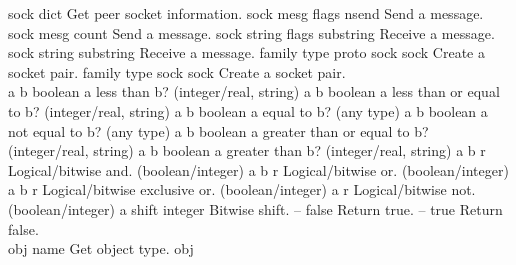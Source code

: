 \begin{longtable}{}
\hline
\optableent
	{sock}
	{{\bf {}}}
	{dict}
	{Get peer socket information.}
\hline
\optableent
	{sock mesg flags}
	{{\bf {}}}
	{nsend}
	{Send a message.}
\optableent
	{sock mesg}
	{{\bf {}}}
	{count}
	{Send a message.}
\hline
\optableent
	{sock string flags}
	{{\bf {}}}
	{substring}
	{Receive a message.}
\optableent
	{sock string}
	{{\bf {}}}
	{substring}
	{Receive a message.}
\hline
\optableent
	{family type proto}
	{{\bf {}}}
	{sock sock}
	{Create a socket pair.}
\optableent
	{family type}
	{{\bf {}}}
	{sock sock}
	{Create a socket pair.}
\hline \hline
{} \\
\hline \hline
\optableent
	{a b}
	{{\bf {}}}
	{boolean}
	{a less than b? (integer/real, string)}
\hline
\optableent
	{a b}
	{{\bf {}}}
	{boolean}
	{a less than or equal to b? (integer/real, string)}
\hline
\optableent
	{a b}
	{{\bf {}}}
	{boolean}
	{a equal to b? (any type)}
\hline
\optableent
	{a b}
	{{\bf {}}}
	{boolean}
	{a not equal to b? (any type)}
\hline
\optableent
	{a b}
	{{\bf {}}}
	{boolean}
	{a greater than or equal to b? (integer/real, string)}
\hline
\optableent
	{a b}
	{{\bf {}}}
	{boolean}
	{a greater than b? (integer/real, string)}
\hline
\optableent
	{a b}
	{{\bf {}}}
	{r}
	{Logical/bitwise and. (boolean/integer) }
\hline
\optableent
	{a b}
	{{\bf {}}}
	{r}
	{Logical/bitwise or. (boolean/integer)}
\hline
\optableent
	{a b}
	{{\bf {}}}
	{r}
	{Logical/bitwise exclusive or. (boolean/integer)}
\hline
\optableent
	{a}
	{{\bf {}}}
	{r}
	{Logical/bitwise not. (boolean/integer)}
\hline
\optableent
	{a shift}
	{{\bf {}}}
	{integer}
	{Bitwise shift.}
\hline
\optableent
	{--}
	{{\bf {}}}
	{false}
	{Return true.}
\hline
\optableent
	{--}
	{{\bf {}}}
	{true}
	{Return false.}
\hline \hline
{} \\
\hline \hline
\optableent
	{obj}
	{{\bf {}}}
	{name}
	{Get object type.}
\hline
\optableent
	{obj}
	{{\bf {}}}

\end{longtable}
